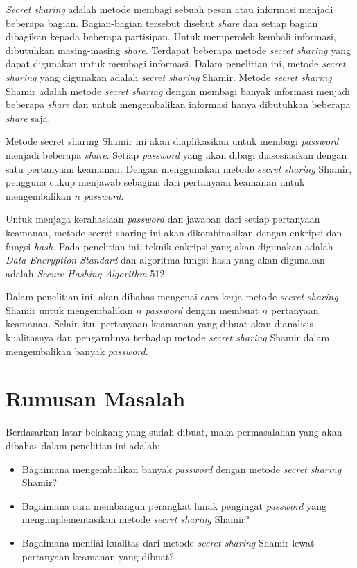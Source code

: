 \textit{Secret sharing} adalah metode membagi sebuah pesan atau informasi menjadi beberapa bagian. Bagian-bagian tersebut disebut \textit{share} dan setiap bagian dibagikan kepada beberapa partisipan. Untuk memperoleh kembali informasi, dibutuhkan masing-masing \textit{share}. Terdapat beberapa metode \textit{secret sharing} yang dapat digunakan untuk membagi informasi. Dalam penelitian ini, metode \textit{secret sharing} yang digunakan adalah \textit{secret sharing} Shamir. Metode \textit{secret sharing} Shamir adalah metode \textit{secret sharing} dengan membagi banyak informasi menjadi beberapa \textit{share} dan untuk mengembalikan informasi hanya dibutuhkan beberapa \textit{share} saja.

Metode secret sharing Shamir ini akan diaplikasikan untuk membagi \textit{password} menjadi beberapa \textit{share}. Setiap \textit{password} yang akan dibagi diasosiasikan dengan satu pertanyaan keamanan. Dengan menggunakan metode \textit{secret sharing} Shamir, pengguna cukup menjawab sebagian dari pertanyaan keamanan untuk mengembalikan $n$ \textit{password}.

Untuk menjaga kerahasiaan \textit{password} dan jawaban dari setiap pertanyaan keamanan, metode secret sharing ini akan dikombinasikan dengan enkripsi dan fungsi \textit{hash}. Pada penelitian ini, teknik enkripsi yang akan digunakan adalah \textit{Data Encryption Standard} dan algoritma fungsi hash yang akan digunakan adalah \textit{Secure Hashing Algorithm} 512.

Dalam penelitian ini, akan dibahas mengenai cara kerja metode \textit{secret sharing} Shamir untuk mengembalikan $n$ \textit{password} dengan membuat $n$ pertanyaan keamanan. Selain itu, pertanyaan keamanan yang dibuat akan dianalisis kualitasnya dan pengaruhnya terhadap metode \textit{secret sharing} Shamir dalam mengembalikan banyak \textit{password}.

\section{Rumusan Masalah}
\label{sec:rumusanmasalah}

Berdasarkan latar belakang yang sudah dibuat, maka permasalahan yang akan dibahas dalam penelitian ini adalah:
\begin{itemize}
	\item Bagaimana mengembalikan banyak \textit{password} dengan metode \textit{secret sharing} Shamir?
	\item Bagaimana cara membangun perangkat lunak pengingat \textit{password} yang mengimplementasikan metode \textit{secret sharing} Shamir?
	\item Bagaimana menilai kualitas dari metode \textit{secret sharing} Shamir lewat pertanyaan keamanan yang dibuat?
\end{itemize}

